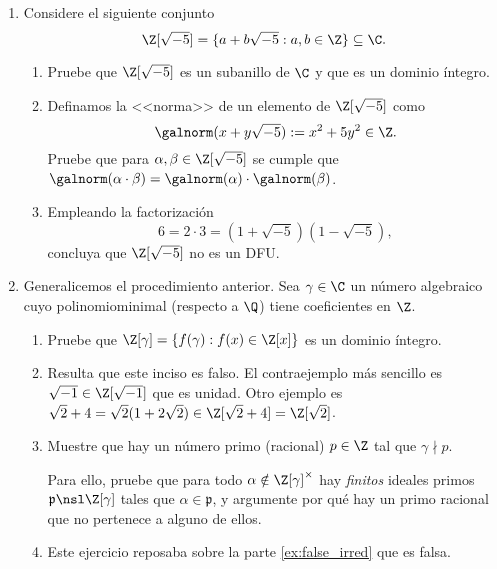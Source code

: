 \documentclass[11pt, reqno]{amsart}
\begin{document}
\begin{enumerate}[resume]
	\item Considere el siguiente conjunto
		\[
			\Z[\sqrt{-5}] = \{ a + b \sqrt{-5} : a, b \in \Z \} \subseteq \C.
		\]
		\begin{enumerate}
			\item Pruebe que $\Z[\sqrt{-5}]$ es un subanillo de $\C$ y que es un dominio íntegro.
			\item Definamos la <<norma>> de un elemento de $\Z[\sqrt{-5}]$ como
				\[
					\galnorm(x + y \sqrt{-5}) := x^2 + 5y^2 \in \Z.
				\]
				Pruebe que para $\alpha, \beta \in \Z[\sqrt{-5}]$ se cumple que $\galnorm(\alpha \cdot \beta) =
				\galnorm(\alpha) \cdot \galnorm(\beta)$.
			\item Empleando la factorización
				\[
					6 = 2\cdot 3 = (1 + \sqrt{-5})(1 - \sqrt{-5}),
				\]
				concluya que $\Z[\sqrt{-5}]$ no es un DFU.
		\end{enumerate}

	\item\label{ex:non_UFD_machine}\lookst
		Generalicemos el procedimiento anterior.
		Sea $\gamma \in \C$ un número algebraico
		cuyo polinomio\break minimal (respecto a $\Q$) tiene
		coeficientes en $\Z$.
		\begin{enumerate}
			\item Pruebe que $\Z[\gamma] = \{ f(\gamma) : f(x) \in \Z[x] \}$ es un dominio íntegro.

			\item\label{ex:false_irred}

				\warn Resulta que este inciso es falso.
				El contraejemplo más sencillo es $\sqrt{-1} \in \Z[\sqrt{-1}]$ que es unidad.
				Otro ejemplo es $\sqrt{2} + 4 = \sqrt{2}(1 + 2 \sqrt{2}) \in \Z[\sqrt{2}+4] = \Z[\sqrt{2}]$.


			\item Muestre que hay un número primo (racional) $p \in \Z$ tal que $\gamma \nmid p$.

				\begin{hint}
					Para ello, pruebe que para todo $\alpha \notin \Z[\gamma]^\times$ hay \emph{finitos} ideales primos
					$\mathfrak{p} \nsl \Z[\gamma]$ tales que $\alpha \in \mathfrak{p}$, y argumente por qué hay un primo
					racional que no pertenece a alguno de ellos.
				\end{hint}

			\item {}

				Este ejercicio reposaba sobre la parte \ref{ex:false_irred} que es falsa.
		\end{enumerate}
\end{enumerate}
\end{document}
